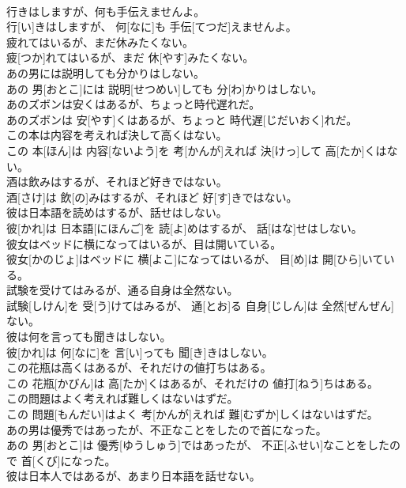 \documentclass[8pt]{extreport}
\begin{document}
\begin{CJK}{UTF8}{min}
\\	行きはしますが、何も手伝えませんよ。	
\\	行[い]きはしますが、 何[なに]も 手伝[てつだ]えませんよ。
\\	疲れてはいるが、まだ休みたくない。	
\\	疲[つか]れてはいるが、まだ 休[やす]みたくない。
\\	あの男には説明しても分かりはしない。	
\\	あの 男[おとこ]には 説明[せつめい]しても 分[わ]かりはしない。
\\	あのズボンは安くはあるが、ちょっと時代遅れだ。	
\\	あのズボンは 安[やす]くはあるが、ちょっと 時代遅[じだいおく]れだ。
\\	この本は内容を考えれば決して高くはない。	
\\	この 本[ほん]は 内容[ないよう]を 考[かんが]えれば 決[けっ]して 高[たか]くはない。
\\	酒は飲みはするが、それほど好きではない。	
\\	酒[さけ]は 飲[の]みはするが、それほど 好[す]きではない。
\\	彼は日本語を読めはするが、話せはしない。	
\\	彼[かれ]は 日本語[にほんご]を 読[よ]めはするが、 話[はな]せはしない。
\\	彼女はベッドに横になってはいるが、目は開いている。	
\\	彼女[かのじょ]はベッドに 横[よこ]になってはいるが、 目[め]は 開[ひら]いている。
\\	試験を受けてはみるが、通る自身は全然ない。	
\\	試験[しけん]を 受[う]けてはみるが、 通[とお]る 自身[じしん]は 全然[ぜんぜん]ない。
\\	彼は何を言っても聞きはしない。	
\\	彼[かれ]は 何[なに]を 言[い]っても 聞[き]きはしない。
\\	この花瓶は高くはあるが、それだけの値打ちはある。	
\\	この 花瓶[かびん]は 高[たか]くはあるが、それだけの 値打[ねう]ちはある。
\\	この問題はよく考えれば難しくはないはずだ。	
\\	この 問題[もんだい]はよく 考[かんが]えれば 難[むずか]しくはないはずだ。
\\	あの男は優秀ではあったが、不正なことをしたので首になった。	
\\	あの 男[おとこ]は 優秀[ゆうしゅう]ではあったが、 不正[ふせい]なことをしたので 首[くび]になった。
\\	彼は日本人ではあるが、あまり日本語を話せない。	

\end{CJK}
\end{document}
